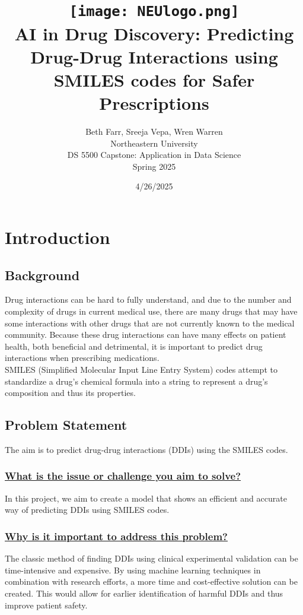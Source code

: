 \documentclass{report}
\title{
    \texttt{[image: NEUlogo.png]}\\[1em] %
    \textbf{AI in Drug Discovery: Predicting Drug-Drug Interactions using SMILES codes for Safer Prescriptions}
}
\author{
    Beth Farr, Sreeja Vepa, Wren Warren \\[0.5em]
    Northeastern University \\[0.5em]
    DS 5500 Capstone: Application in Data Science \\[0.5em]
    Spring 2025
}
\date{4/26/2025}
\begin{document}
\maketitle

\chapter{Introduction}
\section{Background}
Drug interactions can be hard to fully understand, and due to the number and complexity of drugs in current medical use, there are many drugs that may have some interactions with other drugs that are not currently known to the medical community. Because these drug interactions can have many effects on patient health, both beneficial and detrimental, it is important to predict drug interactions when prescribing medications. \\
SMILES (Simplified Molecular Input Line Entry System) codes attempt to standardize a drug's chemical formula into a string to represent a drug's composition and thus its properties.

\section{Problem Statement}
The aim is to predict drug-drug interactions (DDIs) using the SMILES  codes. \\

\subsection{\underline{What is the issue or challenge you aim to solve?}}
 
In this project, we aim to create a model that shows an efficient and accurate way of predicting DDIs using SMILES codes. 

\subsection{\underline{Why is it important to address this problem?}}

The classic method of finding DDIs using clinical experimental validation can be time-intensive and expensive. By using machine learning techniques in combination with research efforts, a more time and cost-effective solution can be created. This would allow for earlier identification of harmful DDIs and thus improve patient safety. 
\end{document}
